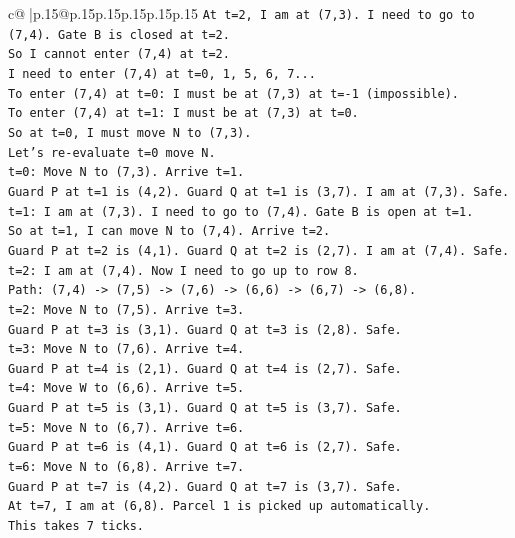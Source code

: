\documentclass{article}
\begin{document}
{\begin{supertabular}{c@{$\;$}|p{.15\linewidth}@{}p{.15\linewidth}p{.15\linewidth}p{.15\linewidth}p{.15\linewidth}p{.15\linewidth}}
{{{\texttt{At t=2, I am at (7,3). I need to go to (7,4). Gate B is closed at t=2.} \\
\texttt{So I cannot enter (7,4) at t=2.} \\
\texttt{I need to enter (7,4) at t=0, 1, 5, 6, 7...} \\
\texttt{To enter (7,4) at t=0: I must be at (7,3) at t={-}1 (impossible).} \\
\texttt{To enter (7,4) at t=1: I must be at (7,3) at t=0.} \\
\texttt{So at t=0, I must move N to (7,3).} \\
\texttt{Let's re{-}evaluate t=0 move N.} \\
\texttt{t=0: Move N to (7,3). Arrive t=1.} \\
\texttt{Guard P at t=1 is (4,2). Guard Q at t=1 is (3,7). I am at (7,3). Safe.} \\
\texttt{t=1: I am at (7,3). I need to go to (7,4). Gate B is open at t=1.} \\
\texttt{So at t=1, I can move N to (7,4). Arrive t=2.} \\
\texttt{Guard P at t=2 is (4,1). Guard Q at t=2 is (2,7). I am at (7,4). Safe.} \\
\texttt{t=2: I am at (7,4). Now I need to go up to row 8.} \\
\texttt{Path: (7,4) {-}> (7,5) {-}> (7,6) {-}> (6,6) {-}> (6,7) {-}> (6,8).} \\
\texttt{t=2: Move N to (7,5). Arrive t=3.} \\
\texttt{Guard P at t=3 is (3,1). Guard Q at t=3 is (2,8). Safe.} \\
\texttt{t=3: Move N to (7,6). Arrive t=4.} \\
\texttt{Guard P at t=4 is (2,1). Guard Q at t=4 is (2,7). Safe.} \\
\texttt{t=4: Move W to (6,6). Arrive t=5.} \\
\texttt{Guard P at t=5 is (3,1). Guard Q at t=5 is (3,7). Safe.} \\
\texttt{t=5: Move N to (6,7). Arrive t=6.} \\
\texttt{Guard P at t=6 is (4,1). Guard Q at t=6 is (2,7). Safe.} \\
\texttt{t=6: Move N to (6,8). Arrive t=7.} \\
\texttt{Guard P at t=7 is (4,2). Guard Q at t=7 is (3,7). Safe.} \\
\texttt{At t=7, I am at (6,8). Parcel 1 is picked up automatically.} \\
\texttt{This takes 7 ticks.} \\
}}}
\end{supertabular}}
\end{document}
